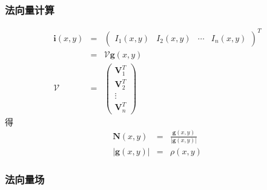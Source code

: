 \documentclass{beamer}
\newcommand{\tmmathbf}[1]{\ensuremath{\boldsymbol{#1}}}
\begin{document}
{{\begin{frame}
\end{frame}

\begin{frame}
  \frametitle{法向量计算}
  \begin{eqnarray*}
    \tmmathbf{i} (x, y) & = & \left(\begin{array}{cccc}
      I_1 (x, y) & I_2 (x, y) & \cdots & I_n (x, y)
    \end{array}\right)^T\\
    & = & \mathcal{V}\tmmathbf{g} (x, y)\\
    \mathcal{V} & = & \left(\begin{array}{c}
      \tmmathbf{V}^T_1\\
      \tmmathbf{V}^T_2\\
      \vdots\\
      \tmmathbf{V}^T_n
    \end{array}\right)
  \end{eqnarray*}
  得
  \begin{eqnarray*}
    \tmmathbf{N} (x, y) & = & \frac{\tmmathbf{g} (x, y)}{| \tmmathbf{g} (x, y)
    |}\\
    | \tmmathbf{g} (x, y) | & = & \rho (x, y)
  \end{eqnarray*}
\end{frame}

\begin{frame}
  \frametitle{法向量场}
  
\end{frame}

}}
\end{document}
